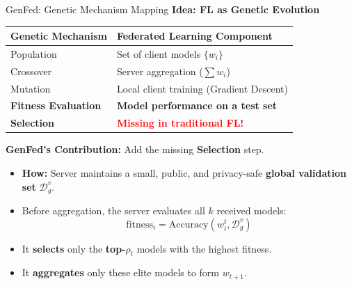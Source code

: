 \documentclass{beamer}
\begin{document}
\begin{frame}{GenFed: Genetic Mechanism Mapping}
\textbf{Idea: FL as Genetic Evolution}
\begin{table}
\centering
\begin{tabular}{ll}
\toprule
\textbf{Genetic Mechanism} & \textbf{Federated Learning Component} \\
\midrule
Population & Set of client models $\{w_i\}$ \\
Crossover & Server aggregation ($\sum w_i$) \\
Mutation & Local client training (Gradient Descent) \\
\textbf{Fitness Evaluation} & \textbf{Model performance on a test set} \\
\textbf{Selection} & \textbf{\textcolor{red}{Missing in traditional FL!}} \\
\bottomrule
\end{tabular}
\end{table}

\vspace{0.3cm}
\textbf{GenFed's Contribution:} Add the missing \textbf{Selection} step.
\begin{itemize}
    \item \textbf{How:} Server maintains a small, public, and privacy-safe \textbf{global validation set} $\mathcal{D}_g^{v}$.
    \item Before aggregation, the server evaluates all $k$ received models:
    $$ \text{fitness}_i = \text{Accuracy}(w_i^t, \mathcal{D}_g^{v})$$
    \item It \textbf{selects} only the \textbf{top-$\rho_t$} models with the highest fitness.
    \item It \textbf{aggregates} only these elite models to form $w_{t+1}$.
\end{itemize}
\end{frame}
\end{document}
